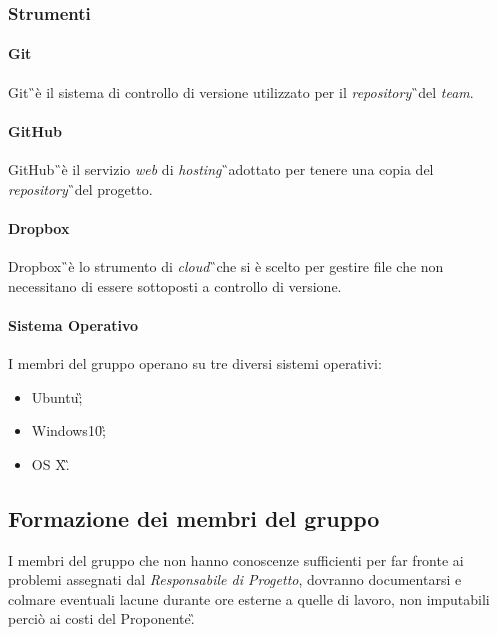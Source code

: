 \subsubsection{Strumenti}
\paragraph{Git} Git\G\ è il sistema di controllo di versione utilizzato per il \textit{repository}\G\ del \textit{team}.

\paragraph{GitHub} GitHub\G\ è il servizio \textit{web} di \textit{hosting}\G\ adottato per tenere una
copia del \textit{repository}\G\ del progetto.

\paragraph{Dropbox} Dropbox\G\ è lo strumento di \textit{cloud}\G\ che si è scelto
per gestire file che non necessitano di essere sottoposti a controllo di versione.

\paragraph{Sistema Operativo} I membri del gruppo operano su tre diversi sistemi operativi:
\begin{itemize}
\item Ubuntu\G;
\item Windows10\G;
\item OS X\G.
\end{itemize} 

\subsection{Formazione dei membri del gruppo}
I membri del gruppo che non hanno conoscenze sufficienti per far fronte ai problemi assegnati dal \textit{Responsabile di Progetto}, dovranno
documentarsi e colmare eventuali lacune durante ore esterne a quelle di lavoro, non imputabili
perciò ai costi del Proponente\G .

